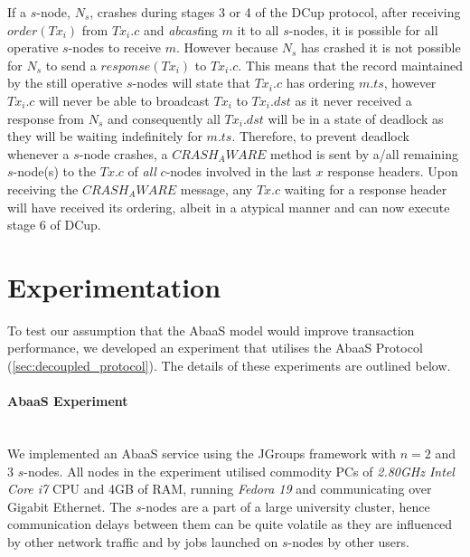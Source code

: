 	If a $s$-node, $N_s$, crashes during stages 3 or 4 of the \textsf{DCup} protocol, after receiving $order(Tx_i)$ from $Tx_i.c$ and \emph{abcast}ing $m$ it to all $s$-nodes, it is possible for all operative $s$-nodes to receive $m$.  However because $N_s$ has crashed it is not possible for $N_s$ to send a $response(Tx_i)$ to $Tx_i.c$.  This means that the record maintained by the still operative $s$-nodes will state that $Tx_i.c$ has ordering $m.ts$, however $Tx_i.c$ will never be able to broadcast $Tx_i$ to $Tx_i.dst$ as it never received a response from $N_s$ and consequently all $Tx_i.dst$ will be in a state of deadlock as they will be waiting indefinitely for $m.ts$.  Therefore, to prevent deadlock whenever a $s$-node crashes, a $CRASH_AWARE$ method is sent by a/all remaining $s$-node(s) to the $Tx.c$ of \emph{all} $c$-nodes involved in the last $x$ response headers.  Upon receiving the $CRASH_AWARE$ message, any $Tx.c$ waiting for a response header will have received its ordering, albeit in a atypical manner and can now execute stage 6 of \textsf{DCup}.  
	
\section{Experimentation}

To test our assumption that the \textsf{AbaaS} model would improve transaction performance, we developed an experiment that utilises the \textsf{AbaaS} Protocol (\ref{sec:decoupled_protocol}).  The details of these experiments are outlined below. 

\paragraph{AbaaS Experiment} \hspace{0pt} \\
We implemented an \textsf{AbaaS} service using the JGroups\citep{JGroups} framework with $n=2$ and $3$ $s$-nodes.  All nodes in the experiment utilised commodity PCs of \emph{2.80GHz Intel Core i7} CPU and 4GB of RAM, running \emph{Fedora 19} and communicating over Gigabit Ethernet. The $s$-nodes are a part of a large university cluster, hence communication delays between them can be quite volatile as they are influenced by other network traffic and by jobs launched on $s$-nodes by other users.

